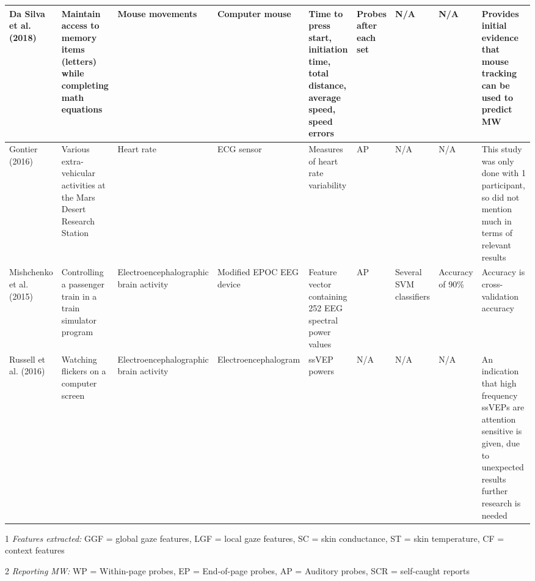 \begin{ThreePartTable}
\begin{xtabular}{P{20mm}P{24mm}P{24mm}P{28mm}P{28mm}P{21mm}P{26mm}P{24mm}P{42mm}}
                Da Silva et al. (2018) \cite{DaSilva2018WanderingWandering} & Maintain access to memory items (letters) while completing math equations & Mouse movements & Computer mouse & Time to press start, initiation time, total distance, average speed, speed errors & Probes after each set & N/A & N/A & Provides initial evidence that mouse tracking can be used to predict MW\\ \midrule
                Gontier (2016) \cite{Gontier2016HowEnvironment} & Various extra-vehicular activities at the Mars Desert Research Station & Heart rate & ECG sensor & Measures of heart rate variability & AP & N/A & N/A & This study was only done with 1 participant, so did not mention much in terms of relevant results \\ \midrule
                Mishchenko et al. (2015) \cite{Mishchenko2015DetectingTespiti} & Controlling a passenger train in a train simulator program & Electroence\-phalo\-graphic brain activity & Modified EPOC EEG device & Feature vector containing 252 EEG spectral power values & AP & Several SVM classifiers & Accuracy of 90\% & Accuracy is cross-validation accuracy \\ \midrule
                Russell et al. (2016) \cite{Russell2016MonitoringEnvironments} & Watching flickers on a computer screen & Electroence\-phalo\-graphic brain activity & Electroence\-phalo\-gram & ssVEP powers & N/A & N/A & N/A & An indication that high frequency ssVEPs are attention sensitive is given, due to unexpected results further research is needed\\ \midrule
                \bottomrule
        \end{xtabular}
        \begin{tablenotes}
                \small
                \item[1] \emph{Features extracted:} GGF = global gaze features, LGF = local gaze features, SC = skin conductance, ST = skin temperature, CF = context features
                \item[2] \emph{Reporting MW:} WP = Within-page probes, EP = End-of-page probes, AP = Auditory probes, SCR = self-caught reports
        \end{tablenotes}
\end{ThreePartTable}
\restoregeometry %
\twocolumn       %